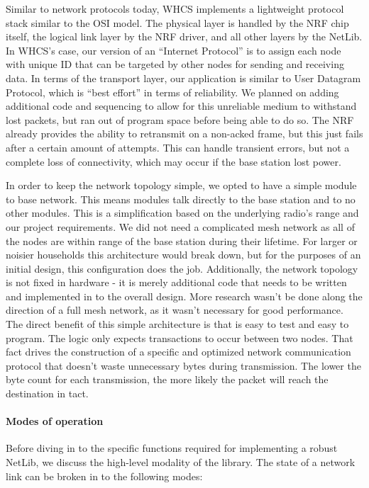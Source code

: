 
Similar to network protocols today, WHCS implements a lightweight protocol
stack similar to the OSI model. The physical layer is handled by the NRF chip
itself, the logical link layer by the NRF driver, and all other layers by the
NetLib. In WHCS's case, our version of an ``Internet Protocol'' is to
assign each node with unique ID that can be targeted by other nodes for sending
and receiving data. In terms of the transport layer, our application is
similar to User Datagram Protocol, which is ``best effort'' in terms of
reliability. We planned on adding additional code and sequencing to allow for this
unreliable medium to withstand lost packets, but ran out of program space before being able to do so. The NRF already provides the
ability to retransmit on a non-acked frame, but this just fails after a
certain amount of attempts. This can handle transient errors, but not a
complete loss of connectivity, which may occur if the base station lost
power.

In order to keep the network topology simple, we opted to have a simple module to
base network. This means modules talk directly to the base station and to
no other modules. This is a simplification based on the underlying radio's
range and our project requirements. We did not need a complicated mesh network
as all of the nodes are within range of the base station during their
lifetime. For larger or noisier households this architecture would break down,
but for the purposes of an initial design, this configuration does the job.
Additionally, the network topology is not fixed in hardware - it is merely
additional code that needs to be written and implemented in to the overall
design. More research wasn't be done along the direction of a full mesh network,
as it wasn't necessary for good performance. The direct benefit of this simple
architecture is that is easy to test and easy to program. The logic only
expects transactions to occur between two nodes. That fact drives the
construction of a specific and optimized network communication protocol that
doesn't waste unnecessary bytes during transmission. The lower the byte count
for each transmission, the more likely the packet will reach the destination in
tact.

\paragraph{Modes of operation}
Before diving in to the specific functions required for implementing a robust
NetLib, we discuss the high-level modality of the library. The state of a
network link can be broken in to the following modes:

